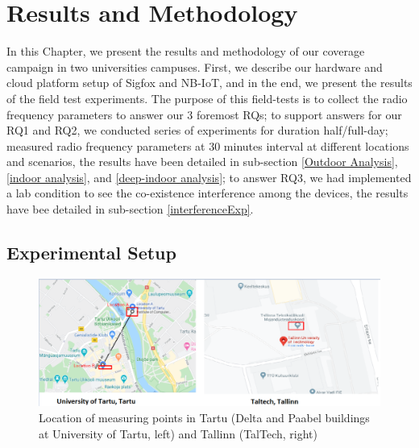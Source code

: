 \documentclass[12pt]{article}
\begin{document}
\section{Results and Methodology}\label{Results and Methodology}
In this Chapter, we present the results and methodology of our coverage campaign in two universities campuses. First, we describe our hardware and cloud platform setup of Sigfox and NB-IoT, and in the end, we present the results of the field test experiments. The purpose of this field-tests is to collect the radio frequency parameters to answer our 3 foremost RQs; to support answers for our RQ1 and RQ2, we conducted series of experiments for duration half/full-day; measured radio frequency parameters at 30 minutes interval at different locations and scenarios, the results have been detailed in sub-section \ref{Outdoor Analysis}, \ref{indoor analysis}, and \ref{deep-indoor analysis}; to answer RQ3, we had implemented a lab condition to see the co-existence interference among the devices, the results have bee detailed in sub-section \ref{interferenceExp}.




\subsection{Experimental Setup}



\begin{figure}[!h]
    \centering
    \includegraphics[width=0.9\columnwidth]{Images/locations.pdf}
    \caption{Location  of  measuring  points  in  Tartu  (Delta and Paabel buildings at  University  of  Tartu,  left)  and  Tallinn (TalTech, right)}
    \label{fig:Observation locations}
\end{figure}
\end{document}

